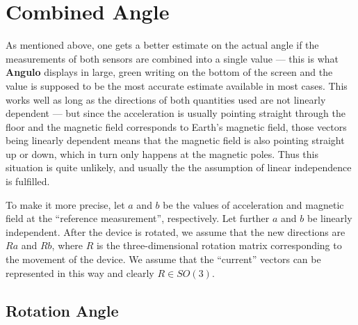 \documentclass{article}
\newcommand{\SO}[1]{\ensuremath{SO\left(#1\right)}}
\newcommand{\Angulo}[0]{\textbf{Angulo} }
\begin{document}
\section{Combined Angle}
\label{sec:combined}

As mentioned above, one gets a better estimate on the actual angle if the
measurements of both sensors are combined into a single value --- this is
what \Angulo displays in large, green writing on the bottom of the screen and
the value is supposed to be the most accurate estimate available in most
cases.  This works well as long as the directions of both quantities used
are not linearly dependent --- but since the acceleration is usually pointing
straight through the floor and the magnetic field corresponds to Earth's
magnetic field,
those vectors being linearly dependent means that the magnetic field is
also pointing straight up or down, which in turn only happens at the
magnetic poles.  Thus this situation is quite unlikely, and usually the
the assumption of linear independence is fulfilled.

To make it more precise, let $a$ and $b$ be the values of acceleration and
magnetic field at the ``reference measurement'', respectively.  Let further
$a$ and $b$ be linearly independent.  After the
device is rotated, we assume that the new directions are $R a$ and $R b$, where
$R$ is the three-dimensional rotation matrix corresponding to the movement of
the device.  We assume that the ``current'' vectors can be represented in this
way and clearly $R \in \SO3$.

\subsection{Rotation Angle}
\end{document}
